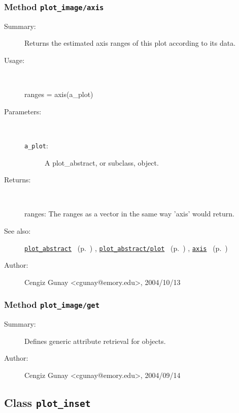 \subsubsection[Method \texttt{axis}]{Method \texttt{plot\_image/axis}}%
%
\label{ref_plot_image__axis}%
\hypertarget{ref_plot_image__axis}{}%
\begin{description}
\item[Summary:]Returns the estimated axis ranges of this plot according to its data.
%
\item[Usage:]~%
\begin{lyxcode}%
ranges = axis(a\_plot)
%
\end{lyxcode}%
%
%
\item[Parameters:]~
\begin{description}%
\item[\texttt{a\_plot}:]
 A plot\_abstract, or subclass, object.
\end{description}%
%
\item[Returns:
]~

	ranges: The ranges as a vector in the same way 'axis' would return.
%
%
\item[See also:]%
\hyperlink{ref_plot_abstract}{\texttt{plot\_abstract}}%
\ (p.~\pageref{ref_plot_abstract})%
%
, \hyperlink{ref_plot_abstract__plot}{\texttt{plot\_abstract/plot}}%
\ (p.~\pageref{ref_plot_abstract__plot})%
%
, \hyperlink{ref_axis}{\texttt{axis}}%
\ (p.~\pageref{ref_axis})%
%
%
\item[Author:]%
Cengiz Gunay <cgunay@emory.edu>, 2004/10/13
%
\end{description}
\methodline%
\subsubsection[Method \texttt{get}]{Method \texttt{plot\_image/get}}%
%
\label{ref_plot_image__get}%
\hypertarget{ref_plot_image__get}{}%
\begin{description}
\item[Summary:]Defines generic attribute retrieval for objects.
%
%
%
%
%
%
%
\item[Author:]%
Cengiz Gunay <cgunay@emory.edu>, 2004/09/14
%
\end{description}
\methodline%
\subsection{Class \texttt{plot\_inset}}%
%
\label{ref_plot_inset}%
\hypertarget{ref_plot_inset}{}%
